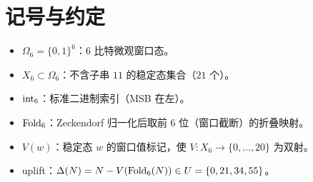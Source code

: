 
\section{记号与约定}

\begin{itemize}
  \item $\Omega_6=\{0,1\}^6$：$6$ 比特微观窗口态。
  \item $X_6\subset\Omega_6$：不含子串 $11$ 的稳定态集合（$21$ 个）。
  \item $\mathrm{int}_6$：标准二进制索引（MSB 在左）。
  \item $\mathrm{Fold}_6$：Zeckendorf 归一化后取前 $6$ 位（窗口截断）的折叠映射。
  \item $V(w)$：稳定态 $w$ 的窗口值标记，使 $V:X_6\to\{0,\dots,20\}$ 为双射。
  \item uplift：$\Delta(N)=N-V(\mathrm{Fold}_6(N))\in U=\{0,21,34,55\}$。
\end{itemize}

